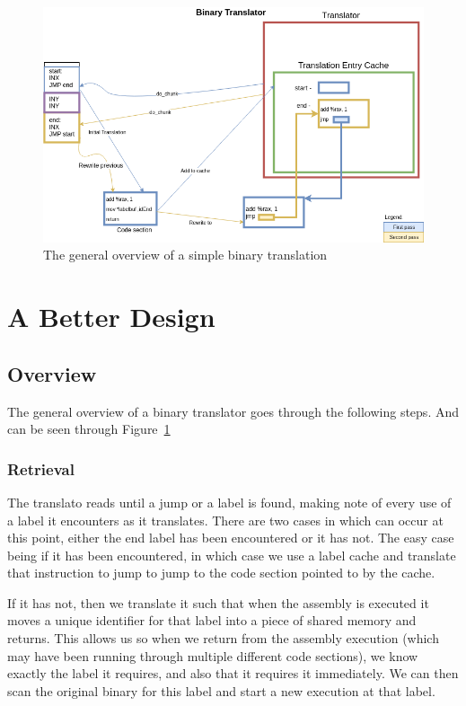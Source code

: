 \begin{figure}[ht] \includegraphics[width=\textwidth]{./images/translator.png}
\caption{The general overview of a simple binary translation} \label{fig:trans}
\end{figure}

\section{A Better Design}

\subsection{Overview}

The general overview of a binary translator goes through the following steps.
And can be seen through Figure~\ref{fig:trans} 

\subsubsection{Retrieval} The translato reads until a jump or a label is found,
making note of every use of a label it encounters as it translates.  There are
two cases in which can occur at this point, either the end label  has been
encountered or it has not.  The easy case being if it has been encountered, in
which case we use a label cache and translate that instruction to jump to jump
to the code section pointed to by the cache.

If it has not, then we translate it such that when the assembly is executed it
moves a unique identifier for that label into a piece of shared memory and
returns.  This allows us so when we return from the assembly execution (which
may have been running through multiple different code sections), we know
exactly the label it requires, and also that it requires it immediately. We can
then scan the original binary for this label and start a new execution at that
label.


